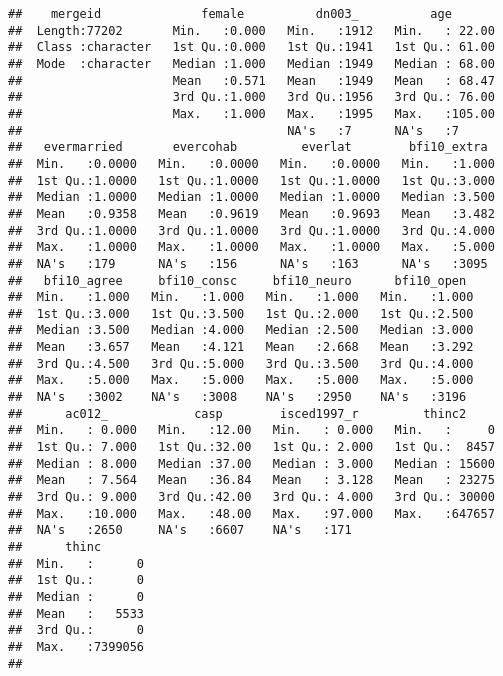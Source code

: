 \documentclass[
]{article}
\begin{document}
\begin{verbatim}
##    mergeid              female          dn003_          age        
##  Length:77202       Min.   :0.000   Min.   :1912   Min.   : 22.00  
##  Class :character   1st Qu.:0.000   1st Qu.:1941   1st Qu.: 61.00  
##  Mode  :character   Median :1.000   Median :1949   Median : 68.00  
##                     Mean   :0.571   Mean   :1949   Mean   : 68.47  
##                     3rd Qu.:1.000   3rd Qu.:1956   3rd Qu.: 76.00  
##                     Max.   :1.000   Max.   :1995   Max.   :105.00  
##                                     NA's   :7      NA's   :7       
##   evermarried       evercohab         everlat        bfi10_extra   
##  Min.   :0.0000   Min.   :0.0000   Min.   :0.0000   Min.   :1.000  
##  1st Qu.:1.0000   1st Qu.:1.0000   1st Qu.:1.0000   1st Qu.:3.000  
##  Median :1.0000   Median :1.0000   Median :1.0000   Median :3.500  
##  Mean   :0.9358   Mean   :0.9619   Mean   :0.9693   Mean   :3.482  
##  3rd Qu.:1.0000   3rd Qu.:1.0000   3rd Qu.:1.0000   3rd Qu.:4.000  
##  Max.   :1.0000   Max.   :1.0000   Max.   :1.0000   Max.   :5.000  
##  NA's   :179      NA's   :156      NA's   :163      NA's   :3095   
##   bfi10_agree     bfi10_consc     bfi10_neuro      bfi10_open   
##  Min.   :1.000   Min.   :1.000   Min.   :1.000   Min.   :1.000  
##  1st Qu.:3.000   1st Qu.:3.500   1st Qu.:2.000   1st Qu.:2.500  
##  Median :3.500   Median :4.000   Median :2.500   Median :3.000  
##  Mean   :3.657   Mean   :4.121   Mean   :2.668   Mean   :3.292  
##  3rd Qu.:4.500   3rd Qu.:5.000   3rd Qu.:3.500   3rd Qu.:4.000  
##  Max.   :5.000   Max.   :5.000   Max.   :5.000   Max.   :5.000  
##  NA's   :3002    NA's   :3008    NA's   :2950    NA's   :3196   
##      ac012_            casp        isced1997_r         thinc2      
##  Min.   : 0.000   Min.   :12.00   Min.   : 0.000   Min.   :     0  
##  1st Qu.: 7.000   1st Qu.:32.00   1st Qu.: 2.000   1st Qu.:  8457  
##  Median : 8.000   Median :37.00   Median : 3.000   Median : 15600  
##  Mean   : 7.564   Mean   :36.84   Mean   : 3.128   Mean   : 23275  
##  3rd Qu.: 9.000   3rd Qu.:42.00   3rd Qu.: 4.000   3rd Qu.: 30000  
##  Max.   :10.000   Max.   :48.00   Max.   :97.000   Max.   :647657  
##  NA's   :2650     NA's   :6607    NA's   :171                      
##      thinc        
##  Min.   :      0  
##  1st Qu.:      0  
##  Median :      0  
##  Mean   :   5533  
##  3rd Qu.:      0  
##  Max.   :7399056  
## 
\end{verbatim}
\end{document}
